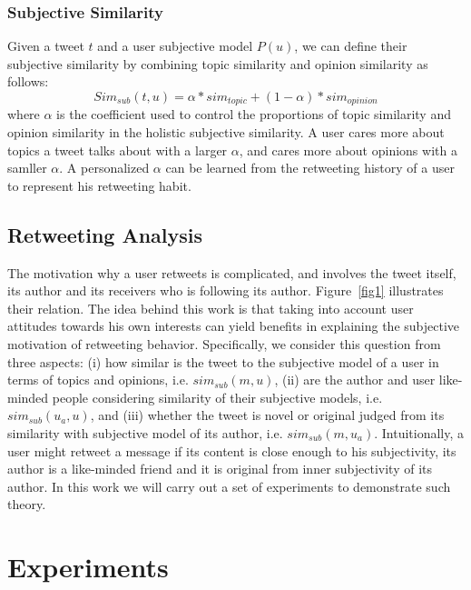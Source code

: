 \documentclass[letterpaper]{article}
\begin{document}
\subsubsection{Subjective Similarity}

Given a tweet $ t $ and a user subjective model $ P\left( u \right)  $, we can define their subjective similarity by combining topic similarity and opinion similarity as follows:
\begin{equation}
Sim_{sub} \left( t,u \right) = \alpha * sim_{topic}+\left( 1-\alpha \right)*sim_{opinion}
\end{equation}
where $ \alpha $ is the coefficient used to control the proportions of topic similarity and opinion similarity in the holistic subjective similarity. 
A user cares more about topics a tweet talks about with a larger $ \alpha $, and cares more about opinions with a samller $ \alpha $. 
A personalized $ \alpha $ can be learned from the retweeting history of a user to represent his retweeting habit. 

\subsection{Retweeting Analysis}
\label{analysis}
The motivation why a user retweets is complicated, and involves the tweet itself, its author and its receivers who is following its author. 
Figure~\ref{fig1} illustrates their relation. 
The idea behind this work is that taking into account user attitudes towards his own interests can yield benefits in explaining the subjective motivation of retweeting behavior. 
Specifically, we consider this question from three aspects: 
(i) how similar is the tweet to the subjective model of a user in terms of topics and opinions, i.e. $ sim_{sub} \left( m,u \right) $, (ii) are the author and user like-minded people considering similarity of their subjective models, i.e. $ sim_{sub}\left( u_{a},u \right)  $, and (iii) whether the tweet is novel or original judged from its similarity with subjective model of its author, i.e. $ sim_{sub}\left( m,u_{a} \right)  $. 
Intuitionally, a user might retweet a message if its content is close enough to his subjectivity, its author is a like-minded friend and it is original from inner subjectivity of its author. 
In this work we will carry out a set of experiments to demonstrate such theory.

\section{Experiments}
\label{experiments}
\end{document}
